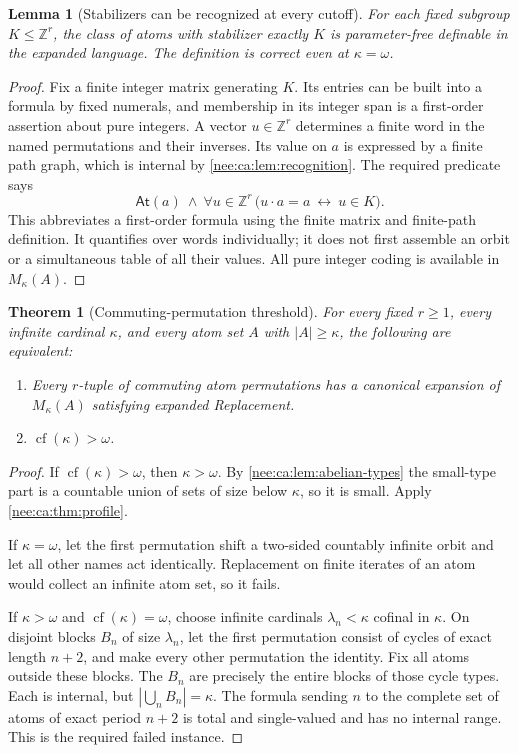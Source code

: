 \documentclass[11pt,letterpaper]{article}
\numberwithin{equation}{section}
\theoremstyle{plain}
\newtheorem{theorem}{Theorem}[section]
\newtheorem{lemma}[lemma]{Lemma}
\theoremstyle{definition}
\theoremstyle{remark}
\newcommand{\At}{\mathsf{At}}
\newcommand{\cf}{\operatorname{cf}}
\newcommand{\Mk}{M_\kappa(A)}
\newcommand{\ZZ}{\mathbb Z}
\begin{document}
\begin{lemma}[Stabilizers can be recognized at every cutoff]\label{nee:ca:lem:stab-definable}
For each fixed subgroup $K\leq\ZZ^r$, the class of atoms with stabilizer exactly $K$ is parameter-free definable in the expanded language. The definition is correct even at $\kappa=\omega$.
\end{lemma}
\begin{proof}
Fix a finite integer matrix generating $K$. Its entries can be built into a formula by fixed numerals, and membership in its integer span is a first-order assertion about pure integers. A vector $u\in\ZZ^r$ determines a finite word in the named permutations and their inverses. Its value on $a$ is expressed by a finite path graph, which is internal by \cref{nee:ca:lem:recognition}. The required predicate says
\begin{equation}\label{nee:ca:eq:stabilizer-formula}
\At(a)\ \land\
\forall u\in\ZZ^r\,
\bigl(u\cdot a=a\ \longleftrightarrow\ u\in K\bigr).
\end{equation}
This abbreviates a first-order formula using the finite matrix and finite-path definition. It quantifies over words individually; it does not first assemble an orbit or a simultaneous table of all their values. All pure integer coding is available in $\Mk$.
\end{proof}

\begin{theorem}[Commuting-permutation threshold]\label{nee:ca:thm:commuting}
For every fixed $r\geq1$, every infinite cardinal $\kappa$, and every atom set $A$ with $|A|\geq\kappa$, the following are equivalent:
\begin{enumerate}[label=(\roman*)]
\item Every $r$-tuple of commuting atom permutations has a canonical expansion of $\Mk$ satisfying expanded Replacement.
\item $\cf(\kappa)>\omega$.
\end{enumerate}
\end{theorem}
\begin{proof}
If $\cf(\kappa)>\omega$, then $\kappa>\omega$. By \cref{nee:ca:lem:abelian-types} the small-type part is a countable union of sets of size below $\kappa$, so it is small. Apply \cref{nee:ca:thm:profile}.

If $\kappa=\omega$, let the first permutation shift a two-sided countably infinite orbit and let all other names act identically. Replacement on finite iterates of an atom would collect an infinite atom set, so it fails.

If $\kappa>\omega$ and $\cf(\kappa)=\omega$, choose infinite cardinals $\lambda_n<\kappa$ cofinal in $\kappa$. On disjoint blocks $B_n$ of size $\lambda_n$, let the first permutation consist of cycles of exact length $n+2$, and make every other permutation the identity. Fix all atoms outside these blocks. The $B_n$ are precisely the entire blocks of those cycle types. Each is internal, but $|\bigcup_n B_n|=\kappa$. The formula sending $n$ to the complete set of atoms of exact period $n+2$ is total and single-valued and has no internal range. This is the required failed instance.
\end{proof}
\end{document}
